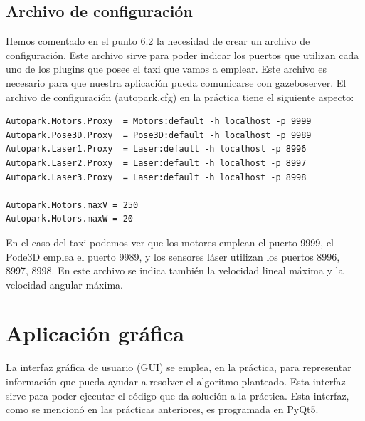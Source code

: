 \subsection{Archivo de configuración}
Hemos comentado en el punto 6.2 la necesidad de crear un archivo de configuración. Este archivo sirve para poder indicar los puertos que utilizan cada uno de los plugins que posee el taxi que vamos a emplear. Este archivo es necesario para que nuestra aplicación pueda comunicarse con gazeboserver. El archivo de configuración (autopark.cfg) en la práctica tiene el siguiente aspecto:\\

\vspace{20pt}
	\begin{lstlisting}[frame=single]
Autopark.Motors.Proxy  = Motors:default -h localhost -p 9999
Autopark.Pose3D.Proxy  = Pose3D:default -h localhost -p 9989
Autopark.Laser1.Proxy  = Laser:default -h localhost -p 8996
Autopark.Laser2.Proxy  = Laser:default -h localhost -p 8997
Autopark.Laser3.Proxy  = Laser:default -h localhost -p 8998

Autopark.Motors.maxV = 250
Autopark.Motors.maxW = 20

	\end{lstlisting}


En el caso del taxi podemos ver que los motores emplean el puerto 9999, el Pode3D emplea el puerto 9989, y los sensores láser utilizan los puertos 8996, 8997, 8998. En este archivo se indica también la velocidad lineal máxima y la velocidad angular máxima.\\

\section{Aplicación gráfica}
La interfaz gráfica de usuario (GUI) se emplea, en la práctica, para representar información que pueda ayudar a resolver el algoritmo planteado. Esta interfaz sirve para poder ejecutar el código que da solución a la práctica. Esta interfaz, como se mencionó en las prácticas anteriores, es programada en PyQt5.\\

